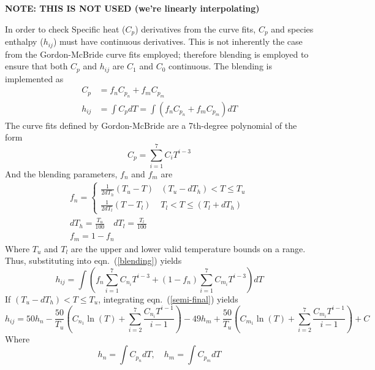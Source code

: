 \documentclass{article}   	%
\begin{document}
\textbf{NOTE: THIS IS NOT USED (we're linearly interpolating)}
\vspace{4mm}

In order to check Specific heat ($C_p$) derivatives from the curve fits, $C_p$
and species enthalpy ($h_{ij}$) must have continuous derivatives.  This is not
inherently the case from the Gordon-McBride curve fits employed; therefore
blending is employed to ensure that both $C_p$ and $h_{ij}$ are $C_1$ and $C_0$
continuous.  The blending is implemented as
\begin{align}
  C_p &= f_n C_{p_n} + f_m C_{p_m} \\
  h_{ij} &= \int C_p dT = \int (f_n C_{p_n} + f_m C_{p_m}) dT
  \label{blending}
\end{align}
The curve fits defined by Gordon-McBride are a 7th-degree polynomial of the form
\begin{equation}
  C_p = \sum_{i=1}^{7} C_i T^{i-3}
  \label{cp_form}
\end{equation}
And the blending parameters, $f_n$ and $f_m$ are
\begin{gather}
  f_n = 
  \begin{cases}
    \frac{1}{2 dT_h} (T_u - T)  &(T_u - dT_h) < T \leq T_u \\
    \frac{1}{2 dT_l} (T - T_l)  &T_l < T \leq (T_l + dT_h)
  \end{cases} \\
  dT_h = \frac{T_u}{100} \quad dT_l = \frac{T_l}{100} \\
  f_m = 1 - f_n
  \label{blending_fxns}
\end{gather}
Where $T_u$ and $T_l$ are the upper and lower valid temperature bounds on a range. Thus, substituting into eqn.~(\ref{blending}) yields
\begin{equation}
  h_{ij} = \int \left(f_n \sum_{i=1}^{7} C_{n_i} T^{i-3} + (1 - f_n) \sum_{i=1}^{7} C_{m_i} T^{i-3}\right) dT
  \label{semi-final}
\end{equation}
If $(T_u - dT_h) < T \leq T_u$, integrating eqn.~(\ref{semi-final}) yields
\begin{equation}
  h_{ij} = 50 h_n - \frac{50}{T_u}\left(C_{n_1}\ln(T) + \sum_{i=2}^{7} \frac{C_{n_i} T^{i-1}}{i-1} \right)
  -49 h_m + \frac{50}{T_u}\left(C_{m_1}\ln(T) + \sum_{i=2}^{7} \frac{C_{m_i} T^{i-1}}{i-1} \right) + C
  \label{up_low_range}
\end{equation}
Where
\begin{equation}
  h_n = \int C_{p_n} dT, \quad h_m = \int C_{p_m} dT
\end{equation}
\end{document}
